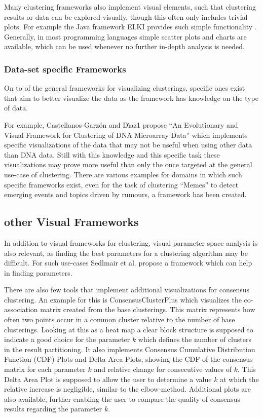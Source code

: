 \documentclass[
	a4paper,
	english,
	twoside,
	openright,               
	11pt                            
	]{report}
\begin{document}
Many clustering frameworks also implement visual elements, such that clustering results or data can be explored visually, though this often only includes trivial plots. For example the Java framework ELKI provides such simple functionality \cite{10.14778/2824032.2824115}. Generally, in most programming languages simple scatter plots and charts are available, which can be used whenever no further in-depth analysis is needed.

\subsubsection{Data-set specific Frameworks}
On to of the general frameworks for visualizing clusterings, specific ones exist that aim to better visualize the data as the framework has knowledge on the type of data. 

For example, Castellanos-Garz\'{o}n and D\'{ı}az1 \cite{DNAVis} propose ``An Evolutionary and Visual Framework for Clustering of DNA Microarray Data'' which implements specific visualizations of the data that may not be useful when using other data than DNA data. Still with this knowledge and this specific task these visualizations may prove more useful than only the once targeted at the general use-case of clustering. There are various examples for domains in which such specific frameworks exist, even for the task of clustering ``Memes'' \cite{Dang2017} to detect emerging events and topics driven by rumours, a framework has been created.

\subsection{other Visual Frameworks}

In addition to visual frameworks for clustering, visual parameter space analysis is also relevant, as finding the best parameters for a clustering algorithm may be difficult. For such use-cases Sedlmair et al. \cite{6876043} propose a framework which can help in finding parameters.

There are also few tools that implement additional visualizations for consensus clustering. An example for this is ConsensusClusterPlus \cite{10.1093/bioinformatics/btq170} which visualizes the co-association matrix created from the base clusterings. This matrix represents how often two points occur in a common cluster relative to the number of base clusterings. Looking at this as a heat map a clear block structure is supposed to indicate a good choice for the parameter $k$ which defines the number of clusters in the result partitioning. It also implements Consensus Cumulative Distribution Function (CDF) Plots and Delta Area Plots, showing the CDF of the consensus matrix for each parameter $k$ and relative change for consecutive values of $k$. This Delta Area Plot is supposed to allow the user to determine a value $k$ at which the relative increase is negligible, similar to the elbow-method. Additional plots are also available, further enabling the user to compare the quality of consensus results regarding the parameter $k$.
\end{document}
